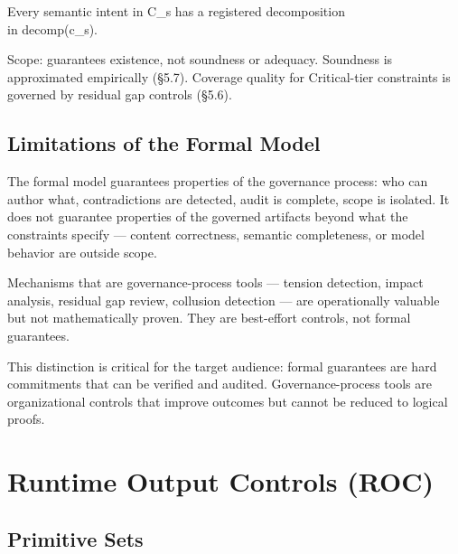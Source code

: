 \begin{cthm}
\begin{claddisp}
Every semantic intent in C\_s has a registered decomposition\\
in decomp(c\_s).\\
\end{claddisp}
Scope: guarantees existence, not soundness or adequacy.
Soundness is approximated empirically (\S{}5.7). Coverage
quality for Critical-tier constraints is governed by
residual gap controls (\S{}5.6).

\end{cthm}


\subsection{Limitations of the Formal Model}
\label{sec:formal-model-A-1-14}


The formal model guarantees properties of the governance process: who can author what, contradictions are detected, audit is complete, scope is isolated. It does not guarantee properties of the governed artifacts beyond what the constraints specify --- content correctness, semantic completeness, or model behavior are outside scope.

Mechanisms that are governance-process tools --- tension detection, impact analysis, residual gap review, collusion detection --- are operationally valuable but not mathematically proven. They are best-effort controls, not formal guarantees.

This distinction is critical for the target audience: formal guarantees are hard commitments that can be verified and audited. Governance-process tools are organizational controls that improve outcomes but cannot be reduced to logical proofs.




\section{Runtime Output Controls (ROC)}
\label{sec:formal-model-A-2}


\subsection{Primitive Sets}
\label{sec:formal-model-A-2-1}


